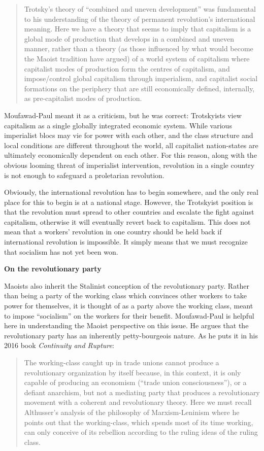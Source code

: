 \blockquote{Trotsky's theory of ``combined and uneven development'' was fundamental to his understanding of the theory of permanent revolution's international meaning. Here we have a theory that seems to imply that capitalism is a global mode of production that develops in a combined and uneven manner, rather than a theory (as those influenced by what would become the Maoist tradition have argued) of a world system of capitalism where capitalist modes of production form the centres of capitalism, and impose/control global capitalism through imperialism, and capitalist social formations on the periphery that are still economically defined, internally, as pre-capitalist modes of production.}

Moufawad-Paul meant it as a criticism, but he was correct: Trotskyists view capitalism as a single globally integrated economic system. While various imperialist blocs may vie for power with each other, and the class structure and local conditions are different throughout the world, all capitalist nation-states are ultimately economically dependent on each other. For this reason, along with the obvious looming threat of imperialist intervention, revolution in a single country is not enough to safeguard a proletarian revolution.

Obviously, the international revolution has to begin somewhere, and the only real place for this to begin is at a national stage. However, the Trotskyist position is that the revolution must spread to other countries and escalate the fight against capitalism, otherwise it will eventually revert back to capitalism. This does not mean that a workers' revolution in one country should be held back if international revolution is impossible. It simply means that we must recognize that socialism has not yet been won.

\textbf{On the revolutionary party}

Maoists also inherit the Stalinist conception of the revolutionary party. Rather than being a party of the working class which convinces other workers to take power for themselves, it is thought of as a party above the working class, meant to impose ``socialism'' on the workers for their benefit. Moufawad-Paul is helpful here in understanding the Maoist perspective on this issue. He argues that the revolutionary party has an inherently petty-bourgeois nature. As he puts it in his 2016 book \emph{Continuity and Rupture}:

\blockquote{The working-class caught up in trade unions cannot produce a revolutionary organization by itself because, in this context, it is only capable of producing an economism (``trade union consciousness''), or a defiant anarchism, but not a mediating party that produces a revolutionary movement with a coherent and revolutionary theory. Here we must recall Althusser's analysis of the philosophy of Marxism-Leninism where he points out that the working-class, which spends most of its time working, can only conceive of its rebellion according to the ruling ideas of the ruling class.}

